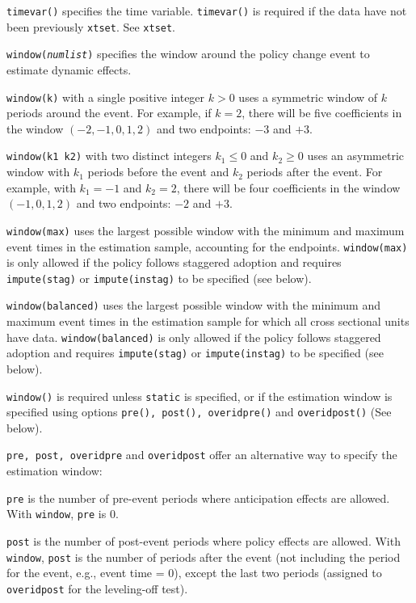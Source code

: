 \documentclass[12pt]{article}
\begin{document}
\hangpara
\texttt{timevar(\varname)} specifies the time variable. \texttt{timevar()} is required if the data have not been previously \texttt{xtset}. See \texttt{xtset}.

\hangpara
{\tt window({\it numlist})} specifies the window around the policy change event to estimate dynamic effects.

\morehangpara
{\tt window(k)} with a single positive integer $k>0$ uses a symmetric window of $k$ periods around the event.
For example, if $k = 2$, there will be five coefficients in the window $(-2,-1,0,1,2)$ and two endpoints: $-3$ and $+3$.

\morehangpara
{\tt window(k1 k2)} with two distinct integers $k_1 \le 0$ and $k_2 \ge 0$ uses an asymmetric window with $k_1$ periods before the event and $k_2$ periods after the event.
For example, with $k_1 = -1$ and $k_2 = 2$, there will be four coefficients in the window $(-1,0,1,2)$ and two endpoints: $-2$ and $+3$.

\morehangpara
{\tt window(max)} uses the largest possible window with the minimum and maximum event times in the estimation sample, accounting for the endpoints.
{\tt window(max)} is only allowed if the policy follows staggered adoption and requires {\tt impute(stag)} or {\tt impute(instag)} to be specified (see below).

\morehangpara
{\tt window(balanced)} uses the largest possible window with the minimum and maximum event times in the estimation sample for which all cross sectional units have data.
{\tt window(balanced)} is only allowed if the policy follows staggered adoption and requires {\tt impute(stag)} or {\tt impute(instag)} to be specified (see below).

\hangpara
{\tt window()} is required unless {\tt static} is specified, or if the estimation window is specified using options {\tt pre(), post(), overidpre()} and {\tt overidpost()} (See below).

\hangpara
{\tt pre, post, overidpre} and {\tt overidpost} offer an alternative way to specify the estimation window:

\morehangpara
{\tt pre} is the number of pre-event periods where anticipation effects are allowed.
With {\tt window}, {\tt pre} is 0.

\morehangpara
{\tt post} is the number of post-event periods where policy effects are allowed.
With {\tt window}, {\tt post} is the number of periods after the event (not including the period for the event, e.g., event time = 0), except the last two periods (assigned to {\tt overidpost} for the leveling-off test).
\end{document}

